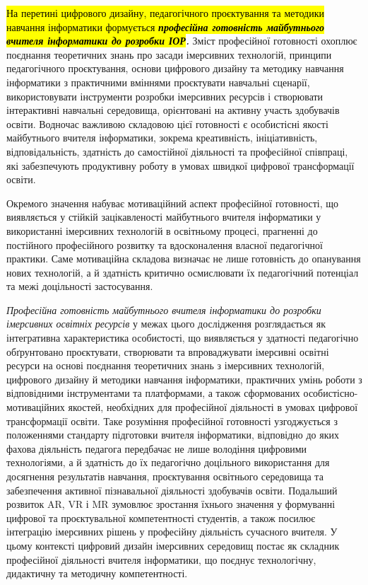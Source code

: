 \hl{На перетині цифрового дизайну, педагогічного проєктування та методики навчання інформатики формується \emph{\textbf{професійна готовність майбутнього вчителя інформатики до розробки ІОР}}}\emph{\textbf{.}} Зміст професійної готовності охоплює поєднання теоретичних знань про засади імерсивних технологій, принципи педагогічного проєктування, основи цифрового дизайну та методику навчання інформатики з практичними вміннями проєктувати навчальні сценарії, використовувати інструменти розробки імерсивних ресурсів і створювати інтерактивні навчальні середовища, орієнтовані на активну участь здобувачів освіти. Водночас важливою складовою цієї готовності є особистісні якості майбутнього вчителя інформатики, зокрема креативність, ініціативність, відповідальність, здатність до самостійної діяльності та професійної співпраці, які забезпечують продуктивну роботу в умовах швидкої цифрової трансформації освіти.

Окремого значення набуває мотиваційний аспект професійної готовності, що виявляється у стійкій зацікавленості майбутнього вчителя інформатики у використанні імерсивних технологій в освітньому процесі, прагненні до постійного професійного розвитку та вдосконалення власної педагогічної практики. Саме мотиваційна складова визначає не лише готовність до опанування нових технологій, а й здатність критично осмислювати їх педагогічний потенціал та межі доцільності застосування.

\emph{Професійна готовність майбутнього вчителя інформатики до розробки імерсивних освітніх ресурсів} у межах цього дослідження розглядається як інтегративна характеристика особистості, що виявляється у здатності педагогічно обґрунтовано проєктувати, створювати та впроваджувати імерсивні освітні ресурси на основі поєднання теоретичних знань з імерсивних технологій, цифрового дизайну й методики навчання інформатики, практичних умінь роботи з відповідними інструментами та платформами, а також сформованих особистісно-мотиваційних якостей, необхідних для професійної діяльності в умовах цифрової трансформації освіти. Таке розуміння професійної готовності узгоджується з положеннями стандарту підготовки вчителя інформатики, відповідно до яких фахова діяльність педагога передбачає не лише володіння цифровими технологіями, а й здатність до їх педагогічно доцільного використання для досягнення результатів навчання, проєктування освітнього середовища та забезпечення активної пізнавальної діяльності здобувачів освіти. Подальший розвиток AR, VR і MR зумовлює зростання їхнього значення у формуванні цифрової та проєктувальної компетентності студентів, а також посилює інтеграцію імерсивних рішень у професійну діяльність сучасного вчителя. У цьому контексті цифровий дизайн імерсивних середовищ постає як складник професійної діяльності вчителя інформатики, що поєднує технологічну, дидактичну та методичну компетентності.

